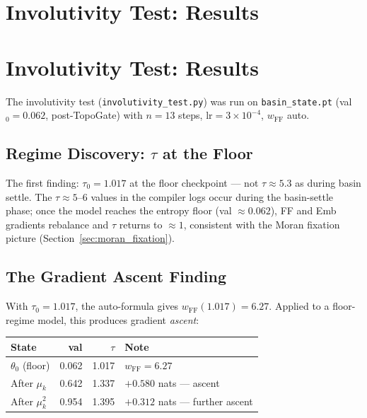 \documentclass[11pt]{amsart}
\begin{document}
\section{Involutivity Test: Results}
\section{Involutivity Test: Results}
\label{sec:involutivity_results}

The involutivity test (\texttt{involutivity\_test.py}) was run on
\texttt{basin\_state.pt} (val$_0=0.062$, post-TopoGate) with
$n=13$ steps, $\mathrm{lr}=3\times10^{-4}$, $w_\mathrm{FF}$ auto.

\subsection{Regime Discovery: $\tau$ at the Floor}

The first finding: $\tau_0 = 1.017$ at the floor checkpoint ---
not $\tau \approx 5.3$ as during basin settle.
The $\tau \approx 5$--$6$ values in the compiler logs occur
during the basin-settle phase; once the model reaches the entropy
floor (val $\approx 0.062$), FF and Emb gradients rebalance and
$\tau$ returns to $\approx 1$, consistent with the Moran
fixation picture (Section~\ref{sec:moran_fixation}).

\subsection{The Gradient Ascent Finding}

With $\tau_0 = 1.017$, the auto-formula gives
$w_\mathrm{FF}(1.017) = 6.27$.
Applied to a floor-regime model, this produces gradient
\emph{ascent}:

\begin{center}
\small
\begin{tabular}{@{}lrrl@{}}
\toprule
State & val & $\tau$ & Note \\
\midrule
$\theta_0$ (floor) & 0.062 & 1.017 & $w_\mathrm{FF} = 6.27$ \\
After $\mu_k$      & 0.642 & 1.337 & $+0.580$ nats --- ascent \\
After $\mu_k^2$    & 0.954 & 1.395 & $+0.312$ nats --- further ascent \\
\bottomrule
\end{tabular}
\end{center}
\end{document}

